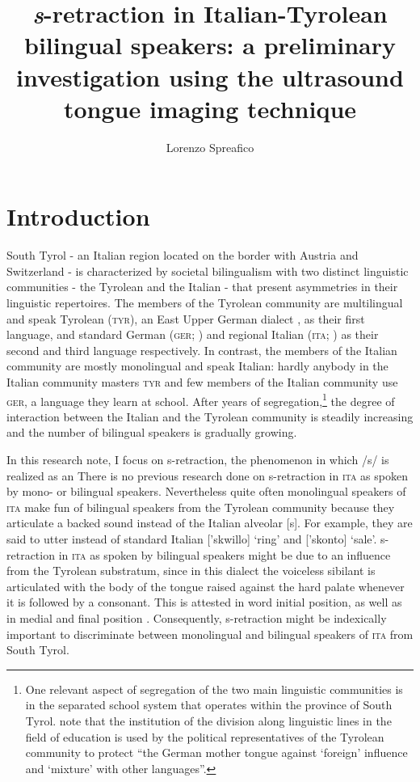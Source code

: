 \documentclass[output=paper]{LSP/langsci}
\author{Lorenzo Spreafico\affiliation{Free University of Bozen-Bolzano}}
\title{\mbox{\em s}-retraction in Italian-Tyrolean bilingual speakers: a preliminary investigation using the ultrasound tongue imaging technique}
\begin{document}
  
\section{Introduction}
South Tyrol - an Italian region located on the border with Austria and Switzerland - is characterized by societal bilingualism with two distinct linguistic communities - the Tyrolean and the Italian - that present asymmetries in their linguistic repertoires. The members of the Tyrolean community are multilingual and speak Tyrolean (\textsc{tyr}), an East Upper German dialect \citep{wiesinger_einteilung_1983,russ_central_1990}, as their first language, and standard German (\textsc{ger}; \citealt{ciccolone_lo_2010}) and regional Italian (\textsc{ita}; \citealt{mioni_litaliano_2001}) as their second and third language respectively. In contrast, the members of the Italian community are mostly monolingual and speak Italian: hardly anybody in the Italian community masters \textsc{tyr} and few members of the Italian community use \textsc{ger}, a language they learn at school. After years of segregation,\footnote{One relevant aspect of segregation of the two main linguistic communities is in the separated school system that operates within the province of South Tyrol. \citet[237]{woelk_educational_2008} note that the institution of the division along linguistic lines in the field of education is used by the political representatives of the Tyrolean community to protect “the German mother tongue against `foreign' influence and `mixture' with other languages”.} the degree of interaction between the Italian and the Tyrolean community is steadily increasing and the number of bilingual speakers is gradually growing.

In this research note, I focus on s-retraction, the phenomenon in which /s/ is realized as an 
There is no previous research done on s-retraction in \textsc{ita} as spoken by mono- or bilingual speakers. Nevertheless quite often monolingual speakers of \textsc{ita} make fun of bilingual speakers from the Tyrolean community because they articulate a backed sound instead of the Italian alveolar [s]. For example, they are said to utter 
instead of standard Italian ['skwillo] `ring' and ['skonto] `sale'. s-retraction in \textsc{ita} as spoken by bilingual speakers might be due to an influence from the Tyrolean substratum, since in this dialect the voiceless sibilant is articulated with the body of the tongue raised against the hard palate whenever it is followed by a consonant. This is attested in word initial position, as well as in medial and final position \citep{alber_regional_2001,alber_silbenonset_2005}. Consequently, s-retraction might be indexically important to discriminate between monolingual and bilingual speakers of \textsc{ita} from South Tyrol.
\end{document}
